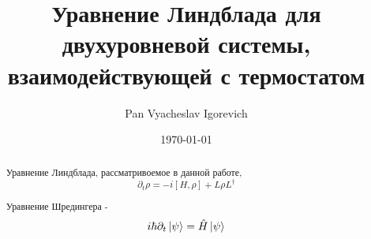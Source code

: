 \documentclass[a4paper,10pt]{article}
\title{Уравнение Линдблада для двухуровневой системы, взаимодействующей с термостатом}
\author{Pan Vyacheslav Igorevich}
\date{\today}
\begin{document}
\maketitle
    \begin{abstract}
        Уравнение Линдблада, рассматривоемое в данной работе, 
        $$\partial_t\rho = -i[H,\rho] + L\rho L^{\dagger}$$
        
        Уравнение Шредингера -
        $$i\hbar\partial_{t} \ket{\psi} = \hat{H}\ket{\psi}$$

    \end{abstract}
\end{document}
